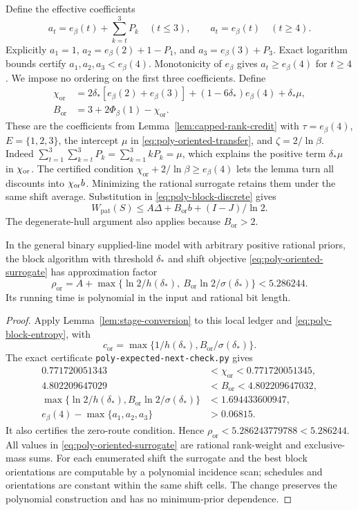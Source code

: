 Define the effective coefficients
\[
 a_t=e_\beta(t)+\sum_{k=t}^{3}P_k\quad(t\le3),\qquad
 a_t=e_\beta(t)\quad(t\ge4).
\]
Explicitly $a_1=1$, $a_2=e_\beta(2)+1-P_1$, and
$a_3=e_\beta(3)+P_3$. Exact logarithm bounds certify
$a_1,a_2,a_3<e_\beta(4)$. Monotonicity of $e_\beta$ gives
$a_t\ge e_\beta(4)$ for $t\ge4$. We impose no ordering on the first
three coefficients. Define
\[
 \begin{aligned}
 \chi_{\mathrm{or}}
 &=2\delta_*[e_\beta(2)+e_\beta(3)]
       +(1-6\delta_*)e_\beta(4)+\delta_*\mu,\\
 B_{\mathrm{or}}&=3+2\Phi_\beta(1)-\chi_{\mathrm{or}}.
 \end{aligned}
\]
These are the coefficients from Lemma~\ref{lem:capped-rank-credit}
with $\tau=e_\beta(4)$, $E=\{1,2,3\}$, the intercept $\mu$ in
\eqref{eq:poly-oriented-transfer}, and $\zeta=2/\ln\beta$.
Indeed $\sum_{t=1}^3\sum_{k=t}^3P_k=\sum_{k=1}^3kP_k=\mu$,
which explains the positive term $\delta_*\mu$ in $\chi_{\rm or}$.
The certified condition
$\chi_{\mathrm{or}}+2/\ln\beta\ge e_\beta(4)$ lets the lemma turn
all discounts into $\chi_{\rm or}b$. Minimizing the rational
surrogate retains them under the same shift average. Substitution in
\eqref{eq:poly-block-discrete} gives
\[
 W_{\mathrm{pat}}(S)\le A\Delta+B_{\mathrm{or}}b+(I-J)/\ln2.
\]
The degenerate-hull argument also applies because $B_{\mathrm{or}}>2$.

\begin{theorem}
\label{thm:poly-oriented-expected}
In the general binary supplied-line model with arbitrary positive
rational priors, the block algorithm with threshold $\delta_*$ and
shift objective \eqref{eq:poly-oriented-surrogate} has approximation
factor
\[
 \boxed{\rho_{\mathrm{or}}=
 A+\max\{\ln2/h(\delta_*),\ B_{\mathrm{or}}\ln2/\sigma(\delta_*)\}
 <5.286244.}
\]
Its running time is polynomial in the input and rational bit length.
\end{theorem}
\begin{proof}
Apply Lemma~\ref{lem:stage-conversion} to this local ledger and
\eqref{eq:poly-block-entropy}, with
\[
 c_{\mathrm{or}}=\max\{1/h(\delta_*),B_{\mathrm{or}}/\sigma(\delta_*)\}.
\]
The exact certificate \texttt{poly-expected-next-check.py} gives
\[
 \begin{aligned}
 0.771720051343&<\chi_{\mathrm{or}}<0.771720051345,\\
 4.802209647029&<B_{\mathrm{or}}<4.802209647032,\\
 \max\{\ln2/h(\delta_*),B_{\mathrm{or}}\ln2/\sigma(\delta_*)\}
 &<1.694433600947,\\
 e_\beta(4)-\max\{a_1,a_2,a_3\}&>0.06815.
 \end{aligned}
\]
It also certifies the zero-route condition. Hence
$\rho_{\mathrm{or}}<5.286243779788<5.286244$.
All values in \eqref{eq:poly-oriented-surrogate} are rational
rank-weight and exclusive-mass sums. For each enumerated shift the
surrogate and the best block orientations are computable by a
polynomial incidence scan; schedules and orientations are constant
within the same shift cells. The change preserves the
polynomial construction and has no minimum-prior dependence.
\end{proof}

